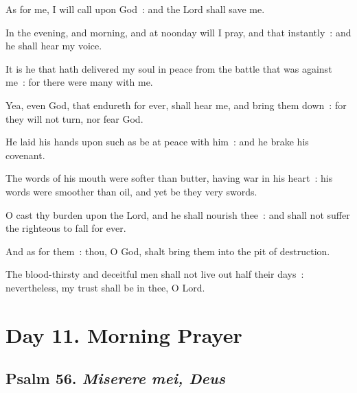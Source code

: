 As for me, I will call upon God~: and the Lord shall save me.\par
{}In the evening, and morning, and at noonday will I pray, and that instantly~: and he shall hear my voice.\par
{}It is he that hath delivered my soul in peace from the battle that was against me~: for there were many with me.\par
{}Yea, even God, that endureth for ever, shall hear me, and bring them down~: for they will not turn, nor fear God.\par
{}He laid his hands upon such as be at peace with him~: and he brake his covenant.\par
{}The words of his mouth were softer than butter, having war in his heart~: his words were smoother than oil, and yet be they very swords.\par
{}O cast thy burden upon the Lord, and he shall nourish thee~: and shall not suffer the righteous to fall for ever.\par
{}And as for them~: thou, O God, shalt bring them into the pit of destruction.\par
{}The blood-thirsty and deceitful men shall not live out half their days~: nevertheless, my trust shall be in thee, O Lord.\par

\section*{Day 11. Morning Prayer}

\subsection{Psalm 56. \textit{Miserere mei, Deus}}


